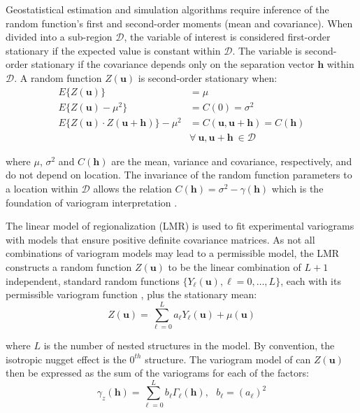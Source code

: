 Geostatistical estimation and simulation algorithms require inference of the random function's first and second-order moments (mean and covariance). When divided into a sub-region $\mathcal{D}$, the variable of interest is considered first-order stationary if the expected value is constant within $\mathcal{D}$. The variable is second-order stationary if the covariance depends only on the separation vector $\mathbf{h}$ within $\mathcal{D}$. A random function $Z(\mathbf{u})$ is second-order stationary when:
\begin{align*}
    E\{Z(\mathbf{u})\}                                          & = \mu                                                         \\
    E\{Z(\mathbf{u}) - \mu^2\}                                  & = C(0) = \sigma^2                                             \\
    E\{Z(\mathbf{u}) \cdot Z(\mathbf{u} + \mathbf{h})\} - \mu^2 & = C(\mathbf{u}, \mathbf{u}+\mathbf{h}) = C(\mathbf{h})        \\
                                                                & \forall \ \mathbf{u}, \mathbf{u}+\mathbf{h} \ \in \mathcal{D}
\end{align*}

\lowercase{Where} $\mu$, $\sigma^2$ and $C(\mathbf{h})$ are the mean, variance and covariance, respectively, and do not depend on location. The invariance of the random function parameters to a location within $\mathcal{D}$ allows the relation $C(\mathbf{h}) = \sigma^2 - \gamma(\mathbf{h})$ which is the foundation of variogram interpretation \citep{pyrcz2014geostatistical}.

The linear model of regionalization (LMR) is used to fit experimental variograms with models that ensure positive definite covariance matrices. As not all combinations of variogram models may lead to a permissible model, the LMR constructs a random function $Z(\mathbf{u})$ to be the linear combination of $L+1$ independent, standard random functions $\{Y_{\ell}(\mathbf{u}), \ell=0,\dots,L\}$, each with its permissible variogram function \citep{goovaerts1997geostatistics}, plus the stationary mean:
\begin{equation*}
    Z(\mathbf{u}) = \sum_{\ell=0}^{L} a_{\ell} Y_{\ell}(\mathbf{u}) + \mu(\mathbf{u})
\end{equation*}

\lowercase{Where} $L$ is the number of nested structures in the model. By convention, the isotropic nugget effect is the $0^{th}$ structure. The variogram model of can $Z(\mathbf{u})$ then be expressed as the sum of the variograms for each of the factors:
\begin{equation*}
    \gamma_z(\mathbf{h}) = \sum_{\ell=0}^{L} b_{\ell} \Gamma_{\ell}(\mathbf{h}), \ \ \ b_{\ell} = (a_{\ell})^{2}
\end{equation*}

